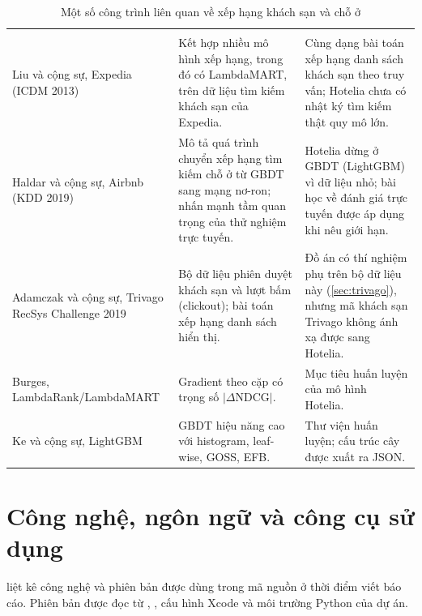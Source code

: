 \begin{rtable}
\begin{longtable}{|L{3.5cm}|L{5.4cm}|L{5.9cm}|}
\caption{Một số công trình liên quan về xếp hạng khách sạn và chỗ ở}\label{tab:related}\\
\hline
{} &  &  \\ \hline
\endfirsthead
\hline
{} &  &  \\ \hline
\endhead
Liu và cộng sự, Expedia (ICDM 2013) \cite{liu2013expedia} & Kết hợp nhiều mô hình xếp hạng, trong đó có LambdaMART, trên dữ liệu tìm kiếm khách sạn của Expedia. & Cùng dạng bài toán xếp hạng danh sách khách sạn theo truy vấn; Hotelia chưa có nhật ký tìm kiếm thật quy mô lớn. \\ \hline
Haldar và cộng sự, Airbnb (KDD 2019) \cite{haldar2019} & Mô tả quá trình chuyển xếp hạng tìm kiếm chỗ ở từ GBDT sang mạng nơ-ron; nhấn mạnh tầm quan trọng của thử nghiệm trực tuyến. & Hotelia dừng ở GBDT (LightGBM) vì dữ liệu nhỏ; bài học về đánh giá trực tuyến được áp dụng khi nêu giới hạn. \\ \hline
Adamczak và cộng sự, Trivago RecSys Challenge 2019 \cite{adamczak2019} & Bộ dữ liệu phiên duyệt khách sạn và lượt bấm (clickout); bài toán xếp hạng danh sách hiển thị. & Đồ án có thí nghiệm phụ trên bộ dữ liệu này (\cref{sec:trivago}), nhưng mã khách sạn Trivago không ánh xạ được sang Hotelia. \\ \hline
Burges, LambdaRank/\allowbreak LambdaMART \cite{burges2010} & Gradient theo cặp có trọng số $|\Delta\text{NDCG}|$. & Mục tiêu huấn luyện của mô hình Hotelia. \\ \hline
Ke và cộng sự, LightGBM \cite{ke2017} & GBDT hiệu năng cao với histogram, leaf-wise, GOSS, EFB. & Thư viện huấn luyện; cấu trúc cây được xuất ra JSON. \\ \hline
\end{longtable}
\end{rtable}

\section{Công nghệ, ngôn ngữ và công cụ sử dụng}\label{sec:stack}

 liệt kê công nghệ và phiên bản được dùng trong mã nguồn ở thời điểm viết báo cáo. Phiên bản được đọc từ , , cấu hình Xcode và môi trường Python của dự án.

